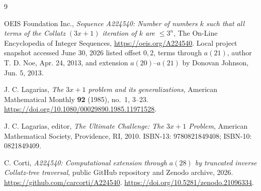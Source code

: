 \documentclass[11pt]{article}
\theoremstyle{definition}
\theoremstyle{remark}
\begin{document}
\begin{thebibliography}{9}
\sloppy
\raggedright

OEIS Foundation Inc.,
\emph{Sequence A224540: Number of numbers \(k\) such that all terms of the
Collatz \((3x+1)\) iteration of \(k\) are \(\leq 3^n\)},
The On-Line Encyclopedia of Integer Sequences,
\url{https://oeis.org/A224540}.
Local project snapshot accessed June 30, 2026 listed offset \(0,2\), terms
through \(a(21)\), author T. D. Noe, Apr. 24, 2013, and extension
\(a(20)\)--\(a(21)\) by Donovan Johnson, Jun. 5, 2013.

J. C. Lagarias,
\emph{The \(3x+1\) problem and its generalizations},
American Mathematical Monthly \textbf{92} (1985), no.~1, 3--23.
\url{https://doi.org/10.1080/00029890.1985.11971528}.

J. C. Lagarias, editor,
\emph{The Ultimate Challenge: The \(3x+1\) Problem},
American Mathematical Society, Providence, RI, 2010.
ISBN-13: 9780821849408; ISBN-10: 0821849409.

C. Corti,
\emph{A224540: Computational extension through \(a(28)\) by truncated inverse
Collatz-tree traversal},
public GitHub repository and Zenodo archive, 2026.
\url{https://github.com/carcorti/A224540}.
\url{https://doi.org/10.5281/zenodo.21096334}.

\end{thebibliography}
\end{document}
